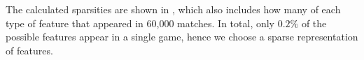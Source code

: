   \begin{table}[!htb]
    \centering
    \caption{The sparsity of each type of feature}\label{tab:featuresparsity}
  \end{table}

The calculated sparsities are shown in , which also includes how many of each type of feature that appeared in 60,000 matches.
In total, only $0.2\%$ of the possible features appear in a single game, hence we choose a sparse representation of features. 


